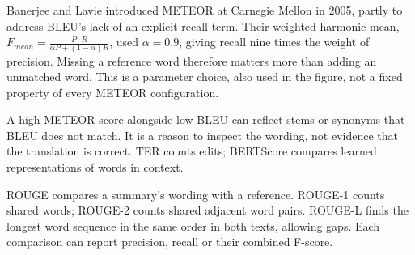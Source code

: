 
{Banerjee and Lavie introduced METEOR at Carnegie Mellon in 2005, partly to address BLEU's lack of an
explicit recall term. Their weighted harmonic mean, $F_{mean}=\frac{P\cdot R}{\alpha P+(1-\alpha)R}$,
used $\alpha=0.9$, giving recall nine times the weight of precision. Missing a reference word therefore
matters more than adding an unmatched word. This is a parameter choice, also used in the figure,
not a fixed property of every METEOR configuration.}

\metricsecondary

A high METEOR score alongside low BLEU can reflect stems or synonyms that BLEU does not match.
It is a reason to inspect the wording, not evidence that the translation is correct. TER counts edits;
BERTScore compares learned representations of words in context.


\metricend
\clearpage
\thispagestyle{nlpstyle}
\label{sec:rouge}

ROUGE compares a summary's wording with a reference. ROUGE-1 counts shared words; ROUGE-2 counts shared adjacent word pairs. ROUGE-L finds the longest word sequence in the same order in both texts, allowing gaps. Each comparison can report precision, recall or their combined F-score.

\begin{metricformula}
\end{metricformula}


